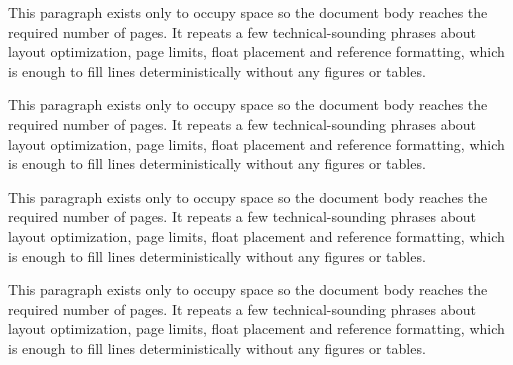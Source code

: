 \documentclass[10pt,letterpaper]{article}
\begin{document}
This paragraph exists only to occupy space so the document body reaches the required number of pages. It repeats a few technical-sounding phrases about layout optimization, page limits, float placement and reference formatting, which is enough to fill lines deterministically without any figures or tables.

This paragraph exists only to occupy space so the document body reaches the required number of pages. It repeats a few technical-sounding phrases about layout optimization, page limits, float placement and reference formatting, which is enough to fill lines deterministically without any figures or tables.

This paragraph exists only to occupy space so the document body reaches the required number of pages. It repeats a few technical-sounding phrases about layout optimization, page limits, float placement and reference formatting, which is enough to fill lines deterministically without any figures or tables.

This paragraph exists only to occupy space so the document body reaches the required number of pages. It repeats a few technical-sounding phrases about layout optimization, page limits, float placement and reference formatting, which is enough to fill lines deterministically without any figures or tables.
\end{document}
